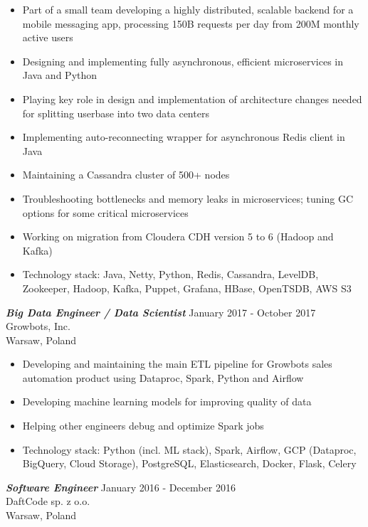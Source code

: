 \documentclass[margin, 10pt]{res} %
\begin{document}
\begin{resume}
\begin{itemize} \itemsep -2pt %
\item Part of a small team developing a highly distributed, scalable backend for a mobile messaging app, processing 150B requests per day from 200M monthly active users
\item Designing and implementing fully asynchronous, efficient microservices in Java and Python
\item Playing key role in design and implementation of architecture changes needed for splitting userbase into two data centers
\item Implementing auto-reconnecting wrapper for asynchronous Redis client in Java
\item Maintaining a Cassandra cluster of 500+ nodes 
\item Troubleshooting bottlenecks and memory leaks in microservices; tuning GC options for some critical microservices
\item Working on migration from Cloudera CDH version 5 to 6 (Hadoop and Kafka)
\item Technology stack: Java, Netty, Python, Redis, Cassandra, LevelDB, Zookeeper, Hadoop, Kafka, Puppet, Grafana, HBase, OpenTSDB, AWS S3
\end{itemize}

{\sl \bf Big Data Engineer / Data Scientist} \hfill January 2017 - October 2017 \\
Growbots, Inc. \\
Warsaw, Poland

\begin{itemize} \itemsep -2pt %
\item Developing and maintaining the main ETL pipeline for Growbots sales automation product using Dataproc, Spark, Python and Airflow 
\item Developing machine learning models for improving quality of data
\item Helping other engineers debug and optimize Spark jobs
\item Technology stack: Python (incl. ML stack), Spark, Airflow, GCP (Dataproc, BigQuery, Cloud Storage), PostgreSQL, Elasticsearch, Docker, Flask, Celery
\end{itemize}

{\sl \bf Software Engineer} \hfill January 2016 - December 2016 \\
DaftCode sp. z o.o. \\
Warsaw, Poland


\end{resume}
\end{document}
